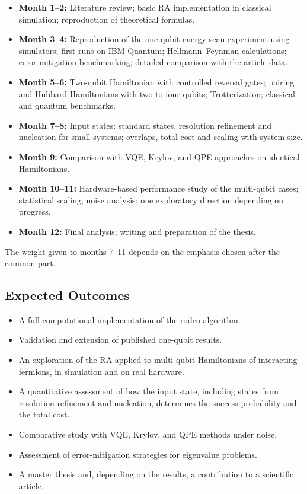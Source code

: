 \documentclass[12pt,a4paper]{article}
\begin{document}
\begin{itemize}
  \item \textbf{Month 1--2:} Literature review; basic RA implementation in classical simulation; reproduction of theoretical formulas.
  \item \textbf{Month 3--4:} Reproduction of the one-qubit energy-scan experiment using simulators; first runs on IBM Quantum; Hellmann--Feynman calculations; error-mitigation benchmarking; detailed comparison with the article data.
  \item \textbf{Month 5--6:} Two-qubit Hamiltonian with controlled reversal gates; pairing and Hubbard Hamiltonians with two to four qubits; Trotterization; classical and quantum benchmarks.
  \item \textbf{Month 7--8:} Input states: standard states, resolution refinement and nucleation for small systems; overlaps, total cost and scaling with system size.
  \item \textbf{Month 9:} Comparison with VQE, Krylov, and QPE approaches on identical Hamiltonians.
  \item \textbf{Month 10--11:} Hardware-based performance study of the multi-qubit cases; statistical scaling; noise analysis; one exploratory direction depending on progress.
  \item \textbf{Month 12:} Final analysis; writing and preparation of the thesis.
\end{itemize}
The weight given to months 7--11 depends on the emphasis chosen after
the common part.

\subsection*{Expected Outcomes}

\begin{itemize}
  \item A full computational implementation of the rodeo algorithm.
  \item Validation and extension of published one-qubit results.
  \item An exploration of the RA applied to multi-qubit Hamiltonians of interacting fermions, in simulation and on real hardware.
  \item A quantitative assessment of how the input state, including states from resolution refinement and nucleation, determines the success probability and the total cost.
  \item Comparative study with VQE, Krylov, and QPE methods under noise.
  \item Assessment of error-mitigation strategies for eigenvalue problems.
  \item A master thesis and, depending on the results, a contribution to a scientific article.
\end{itemize}
\end{document}

